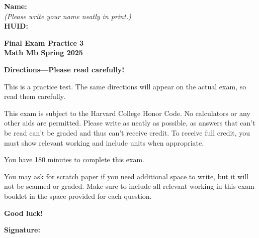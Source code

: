 \documentclass{article}
\begin{document}
{\large \mbox{} \hfill \bf Name:\underline{\hspace{3in}}}\\[2pt]
{\mbox{} \hfill \it (Please write your name neatly in print.)}\\[12pt]
{\large \mbox{} \hfill \bf HUID:\underline{\hspace{3in}}}
 
\medskip
 
\noindent
{\large\bf
Final Exam Practice 3\\
Math Mb Spring 2025}
\noindent


{\Large
\begin{center}\textbf{Directions---Please read carefully!} \end{center}}

This is a practice test. The same directions will appear on the actual exam, so read them carefully.

\hrulefill 


This exam is subject to the Harvard College Honor Code. No calculators or any other aids are permitted.  Please write as neatly as possible, as answers that can't be read can't be graded and thus can't receive credit. To receive full credit, you must show relevant working
and include units when appropriate. 

You have 180 minutes to complete this exam. 

You may ask for scratch paper if you need additional space to write, but it will not be scanned or graded. Make sure to include all relevant working in this exam booklet in the space provided for each question.

\begin{center}\textbf{Good luck!}\end{center}


\vfill

\vspace{0.3in}

{\large \mbox{} \hfill \bf Signature:\underline{\hspace{3in}}}
\thispagestyle{empty}

\newpage
\end{document}
